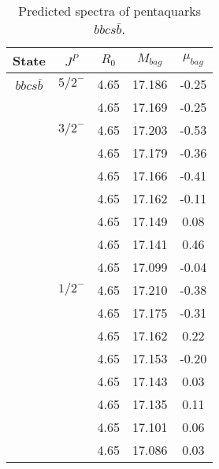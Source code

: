 \documentclass[prd,twocolumn,floatfix,nofootinbib]{revtex4}
\begin{document}
\renewcommand{\tabcolsep}{0.5cm}
\renewcommand{\arraystretch}{1.2}
\begin{table*}[!htbp]
    \caption{Predicted spectra of pentaquarks $bbcs\bar{b}$.}
    \begin{tabular}{ccccc}
        \hline\hline
        {\rm State} &$J^{P}$ &$R_{0}$ &$M_{bag}$ &$\mu_{bag}$ \\ \hline
        ${bbcs\bar{b}}$
            &${5/2}^{-}$    &4.65   &17.186 &-0.25 \\
            &               &4.65   &17.169 &-0.25 \\
            &${3/2}^{-}$    &4.65   &17.203 &-0.53 \\
            &               &4.65   &17.179 &-0.36 \\
            &               &4.65   &17.166 &-0.41 \\
            &               &4.65   &17.162 &-0.11 \\
            &               &4.65   &17.149 &0.08 \\
            &               &4.65   &17.141 &0.46 \\
            &               &4.65   &17.099 &-0.04 \\
            &${1/2}^{-}$    &4.65   &17.210 &-0.38 \\
            &               &4.65   &17.175 &-0.31 \\
            &               &4.65   &17.162 &0.22 \\
            &               &4.65   &17.153 &-0.20 \\
            &               &4.65   &17.143 &0.03 \\
            &               &4.65   &17.135 &0.11 \\
            &               &4.65   &17.101 &0.06 \\
            &               &4.65   &17.086 &0.03 \\
        \hline\hline 
    \end{tabular}
\end{table*}
\end{document}
